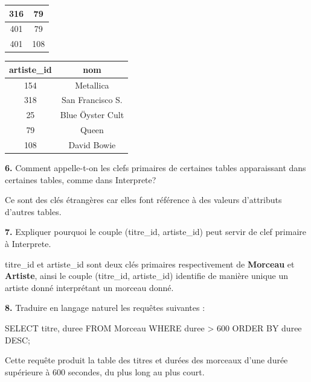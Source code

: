 \documentclass[a4paper,10pt,french]{book}
\begin{document}
\begin{center}
\begin{tabular}{|c|c|}
            \hline
            316 & 79\\
            \hline
            401 & 79\\
            \hline
            401 & 108\\
            \hline
        \end{tabular}	\hspace*{2em}
        \begin{tabular}{|c|c|}
            \hline
            \rowcolor{UGLiOrange} \color{white}\textbf{artiste\_id} &\color{white}\textbf{nom}\\
            \hline
            \color{red} 154   & Metallica	\\
            \hline
            318& \color{red}San Francisco S. \\
            \hline
            25 & \color{red}Blue Öyster Cult\\
            \hline
            79 &\color{red} Queen \\
            \hline
            108	&\color{red} David Bowie\\
            \hline
        \end{tabular}
    \end{center}
    \textbf{6.} Comment appelle-t-on les clefs primaires de certaines tables apparaissant dans certaines tables, comme dans Interprete?
    \begin{encadre}[Réponse]
        Ce sont des clés étrangères car elles font référence à des valeurs d'attributs d'autres tables.
    \end{encadre}
    
    \textbf{7.} Expliquer pourquoi le couple (titre\_id, artiste\_id) peut servir de clef primaire à Interprete.
    
    \begin{encadre}[Réponse]
        titre\_id et artiste\_id sont deux clés primaires respectivement de \textbf{Morceau} et \textbf{Artiste}, ainsi le couple (titre\_id, artiste\_id) identifie de manière unique un artiste donné interprétant un morceau donné.
    \end{encadre}
    \textbf{8.} Traduire en langage naturel les requêtes suivantes :	
    
    \begin{sql}
        SELECT titre, duree FROM Morceau 
        WHERE duree > 600 ORDER BY duree DESC;
    \end{sql}
    
    \begin{encadre}[Réponse]
        Cette requête produit la table des titres et durées des morceaux d'une durée supérieure à 600 secondes, du plus long au plus court.
    \end{encadre}
    
\end{document}
